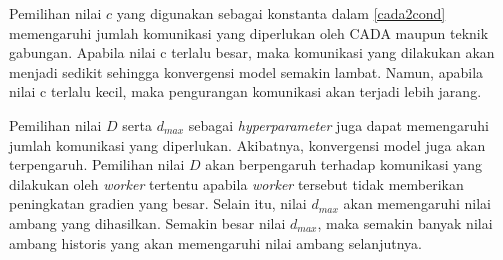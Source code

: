 Pemilihan nilai $c$ yang digunakan sebagai konstanta dalam \autoref{cada2cond} memengaruhi jumlah komunikasi yang diperlukan oleh CADA maupun teknik gabungan. Apabila nilai c terlalu besar, maka komunikasi yang dilakukan akan menjadi sedikit sehingga konvergensi model semakin lambat. Namun, apabila nilai c terlalu kecil, maka pengurangan komunikasi akan terjadi lebih jarang.

Pemilihan nilai $D$ serta $d_{max}$ sebagai \emph{hyperparameter} juga dapat memengaruhi jumlah komunikasi yang diperlukan. Akibatnya, konvergensi model juga akan terpengaruh. Pemilihan nilai $D$ akan berpengaruh terhadap komunikasi yang dilakukan oleh \emph{worker} tertentu apabila \emph{worker} tersebut tidak memberikan peningkatan gradien yang besar. Selain itu, nilai $d_{max}$ akan memengaruhi nilai ambang yang dihasilkan. Semakin besar nilai $d_{max}$, maka semakin banyak nilai ambang historis yang akan memengaruhi nilai ambang selanjutnya.
